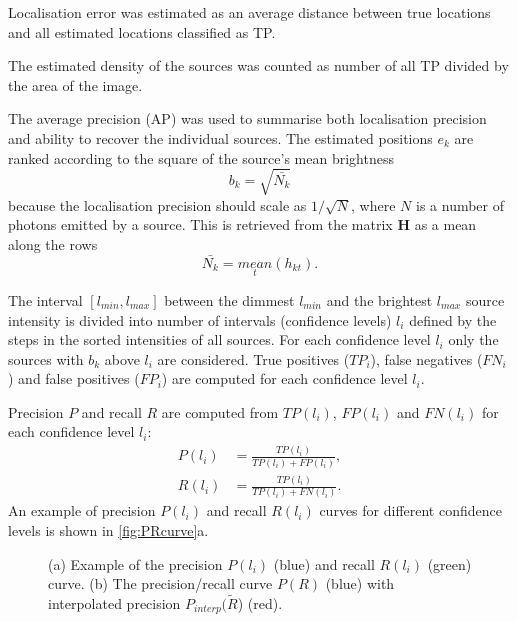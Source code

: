 Localisation error was estimated as an average distance between true locations and all estimated locations classified as TP. 

The estimated density of the sources was counted as number of all TP divided by the area of the image.

The average precision (AP) \cite{Salton1986,Everingham2009} was used to summarise both localisation precision and ability to recover the individual sources. The estimated positions $e_{k}$ are ranked according to the square of the source's mean brightness
%
\begin{equation}
	b_{k}=\sqrt{\bar{N_{k}}}
\end{equation}
%
because the localisation precision should scale as $1/\sqrt{N}$, where $N$ is a number of photons emitted by a source. This is retrieved from the matrix $\bm{H}$ as a mean along the rows
%
\begin{equation}
	\bar{N_{k}}=\underset{t}{\unit{mean}}(h_{kt}).
\end{equation}

The interval $[l_{min},l_{max}]$ between the dimmest $l_{min}$ and the brightest $l_{max}$ source intensity is divided into number of intervals (confidence levels) $l_{i}$ defined by the steps in the sorted intensities of all sources. For each confidence level $l_i$ only the sources with $b_{k}$ above $l_i$ are considered. True positives ($\unit{TP}_{i}$), false negatives ($\unit{FN}_{i}$) and false positives ($\unit{FP}_{i}$) are computed for each confidence level $l_{i}$.

Precision $P$ and recall $R$ are computed from $\unit{TP}(l_{i})$, $\unit{FP}(l_{i})$ and $\unit{FN}(l_{i})$ for each confidence level $l_i$:
%
\begin{align} \label{eq:TP,FN} 
	P(l_i)& = \frac{\unit{TP}(l_i)}{\unit{TP}(l_i)+\unit{FP}(l_i)},\\
	R(l_i)& = \frac{\unit{TP}(l_i)}{\unit{TP}(l_i)+\unit{FN}(l_i)}.
\end{align}
%
An example of precision $P(l_{i})$ and recall $R(l_{i})$ curves for different confidence levels is shown in \autoref{fig:PRcurve}a. 
%
\begin{figure}[!h]
	\newcommand{\widthfig}{.5\textwidth}
	\newcommand{\sizefig}{.4}
	\centering
	\caption{(a) Example of the precision $P(l_{i})$ (blue) and recall $R(l_{i})$ (green) curve. (b) The precision/recall curve $P(R)$ (blue) with interpolated precision $P_{interp}(\tilde{R}$) (red).}
	\label{fig:PRcurve}
\end{figure}

